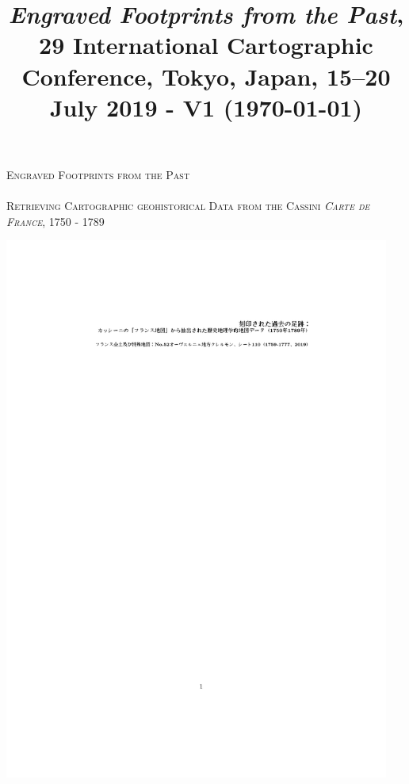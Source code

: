 \documentclass[portrait,a0]{sciposter}
\title{\normalfont \emph{Engraved Footprints from the Past}, 29\up{th} International Cartographic Conference, Tokyo, Japan, 15–20 July 2019 - V1 (\today)}
\institute{EHESS}
\begin{document}
\makeatletter
\conference{\bf \@title}
\makeatother
\bgroup
\setlength{\parindent}{-0.1em} 
\begin{minipage}[t]{0.55\textwidth}
  \Huge
  \textsc{Engraved Footprints from the Past}\\~\\
  \Large \textsc{Retrieving Cartographic geohistorical Data from the Cassini \textit{Carte de France}, 1750 - 1789}
\end{minipage}
\begin{minipage}[t]{0.44\textwidth}
  \vspace*{-3.2cm}
  \hfill
  \includegraphics[width=0.95\textwidth, trim= 5cm 26cm 4cm 22cm, clip]{gfx/jap.pdf}
\end{minipage}
\egroup
\end{document}
